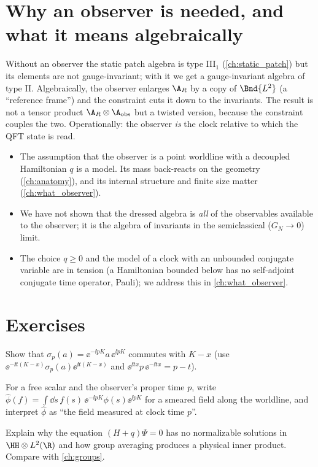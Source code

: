\section{Why an observer is needed, and what it means algebraically}

Without an observer the static patch algebra is type III$_1$ (\cref{ch:static_patch}) but its elements are not gauge-invariant; with it we get a gauge-invariant algebra of type II. Algebraically, the observer enlarges $\A_R$ by a copy of $\Bnd{L^2}$ (a ``reference frame'') and the constraint cuts it down to the invariants. The result is not a tensor product $\A_R\otimes\A_{\rm obs}$ but a twisted version, because the constraint couples the two. Operationally: the observer \emph{is} the clock relative to which the QFT state is read.

\begin{whatwrong}
\begin{itemize}
\item The assumption that the observer is a point worldline with a decoupled Hamiltonian $q$ is a model. Its mass back-reacts on the geometry (\cref{ch:anatomy}), and its internal structure and finite size matter (\cref{ch:what_observer}).
\item We have not shown that the dressed algebra is \emph{all} of the observables available to the observer; it is the algebra of invariants in the semiclassical ($G_N\to0$) limit.
\item The choice $q\ge0$ and the model of a clock with an unbounded conjugate variable are in tension (a Hamiltonian bounded below has no self-adjoint conjugate time operator, Pauli); we address this in \cref{ch:what_observer}.
\end{itemize}
\end{whatwrong}

\section*{Exercises}
\begin{exercise}
Show that $\sigma_p(a)=\ee^{-\ii pK}a\,\ee^{\ii pK}$ commutes with $K-x$ (use $\ee^{-\ii t(K-x)}\sigma_p(a)\ee^{\ii t(K-x)}$ and $\ee^{\ii tx}p\,\ee^{-\ii tx}=p-t$).
\end{exercise}
\begin{exercise}
For a free scalar and the observer's proper time $p$, write $\hat\phi(f)=\int\dd s\,f(s)\,\ee^{-\ii pK}\phi(s)\ee^{\ii pK}$ for a smeared field along the worldline, and interpret $\hat\phi$ as ``the field measured at clock time $p$''.
\end{exercise}
\begin{exercise}
Explain why the equation $(H+q)\Psi=0$ has no normalizable solutions in $\HH\otimes L^2(\R)$ and how group averaging produces a physical inner product. Compare with \cref{ch:groups}.
\end{exercise}
